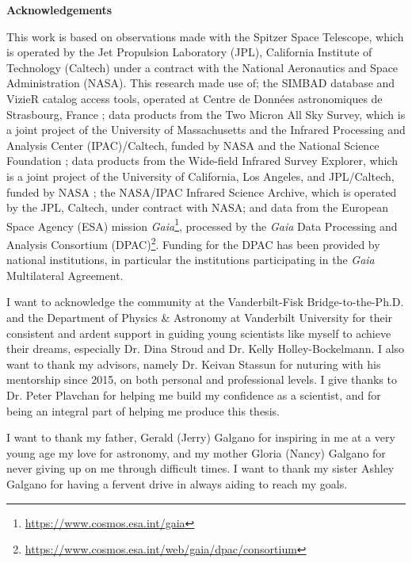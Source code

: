 {}

\noindent \textbf{Acknowledgements}

This work is based on observations made with the Spitzer Space Telescope, which is operated by the Jet Propulsion Laboratory (JPL), California Institute of Technology (Caltech) under a contract with the National Aeronautics and Space Administration (NASA). This research made use of; the SIMBAD database and VizieR catalog access tools, operated at Centre de Donn\'ees astronomiques de Strasbourg, France \citep{VIZIER}; data products from the Two Micron All Sky Survey, which is a joint project of the University of Massachusetts and the Infrared Processing and Analysis Center (IPAC)/Caltech, funded by NASA and the National Science Foundation \citep{2MASS}; data products from the Wide-field Infrared Survey Explorer, which is a joint project of the University of California, Los Angeles, and JPL/Caltech, funded by NASA \citep{WISE}; the NASA/IPAC Infrared Science Archive, which is operated by the JPL, Caltech, under contract with NASA; and data from the European Space Agency (ESA) mission {\it Gaia}\footnote{\url{https://www.cosmos.esa.int/gaia}}, processed by the {\it Gaia} Data Processing and Analysis Consortium (DPAC)\footnote{ \url{https://www.cosmos.esa.int/web/gaia/dpac/consortium}}. Funding for the DPAC has been provided by national institutions, in particular the institutions participating in the {\it Gaia} Multilateral Agreement.

I want to acknowledge the community at the Vanderbilt-Fisk Bridge-to-the-Ph.D. and the Department of Physics \& Astronomy at Vanderbilt University for their consistent and ardent support in guiding young scientists like myself to achieve their dreams, especially Dr. Dina Stroud and Dr. Kelly Holley-Bockelmann.  I also want to thank my advisors, namely Dr. Keivan Stassun for nuturing with his mentorship since 2015, on both personal and professional levels. I give thanks to Dr. Peter Plavchan for helping me build my confidence as a scientist, and for being an integral part of helping me produce this thesis.

I want to thank my father, Gerald (Jerry) Galgano for inspiring in me at a very young age my love for astronomy, and my mother Gloria (Nancy) Galgano for never giving up on me through difficult times. I want to thank my sister Ashley Galgano for having a fervent drive in always aiding to reach my goals.